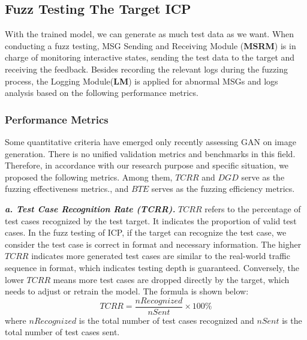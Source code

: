 \subsection{Fuzz Testing The Target ICP}
With the trained model, we can generate as much test data as we want. When conducting a fuzz testing, MSG Sending and Receiving Module (\textbf{MSRM}) is in charge of monitoring interactive states, sending the test data to the target and receiving the feedback. Besides recording the relevant logs during the fuzzing process, the Logging Module(\textbf{LM}) is applied for abnormal MSGs and logs analysis based on the following performance metrics. 

\subsubsection{Performance Metrics}
Some quantitative criteria \cite{heusel2017gans, karras2017progressive, lucic2018gans} have emerged only recently assessing GAN on image generation. There is no unified validation metrics and benchmarks in this field. Therefore, in accordance with our research purpose and specific situation, we proposed the following metrics. Among them, $TCRR$ and $DGD$ serve as the fuzzing effectiveness metrics., and $BTE$ serves as the fuzzing efficiency metrics.

\quad \textit{\textbf{a. Test Case Recognition Rate (TCRR).}} $TCRR$ refers to the percentage of test cases recognized by the test target. It indicates the proportion of valid test cases. In the fuzz testing of ICP, if the target can recognize the test case, we consider the test case is correct in format and necessary information. The higher $TCRR$ indicates more generated test cases are similar to the real-world traffic sequence in format, which indicates testing depth is guaranteed. Conversely, the lower $TCRR$ means more test cases are dropped directly by the target, which needs to adjust or retrain the model. The formula is shown below:
\begin{equation}
TCRR = \frac{{nRecognized}}{{nSent}} \times 100\% 
\end{equation}
	where $nRecognized$ is the total number of test cases recognized and $nSent$ is the total number of test cases sent.

